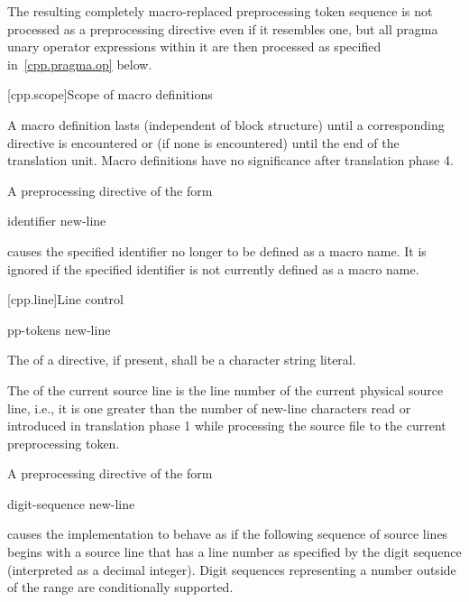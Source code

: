 \pnum
The resulting completely macro-replaced preprocessing token sequence
is not processed as a preprocessing directive even if it resembles one,
but all pragma unary operator expressions within it are then processed as
specified in~\ref{cpp.pragma.op} below.

[cpp.scope]{Scope of macro definitions}%
%

\pnum
A macro definition lasts
(independent of block structure)
until a corresponding
directive is encountered or
(if none is encountered)
until the end of the translation unit.
Macro definitions have no significance after translation phase 4.

\pnum
A preprocessing directive of the form
\begin{ncsimplebnf}
 identifier new-line
%
\end{ncsimplebnf}
causes the specified identifier no longer to be defined as a macro name.
It is ignored if the specified identifier is not currently defined as
a macro name.


[cpp.line]{Line control}%
%

\begin{bnf}
\br
     pp-tokens new-line
\end{bnf}

\pnum
The  of a
directive, if present,
shall be a character string literal.

\pnum
The
of the current source line is
the line number of the current physical source line,
i.e., it is one greater than
the number of new-line characters read or introduced
in translation phase 1
while processing the source file to the current preprocessing token.

\pnum
A preprocessing directive of the form
\begin{ncsimplebnf}
 digit-sequence new-line
\end{ncsimplebnf}
causes the implementation to behave as if
the following sequence of source lines begins with a
source line that has a line number as specified
by the digit sequence (interpreted as a decimal integer).
Digit sequences representing a number
outside of the range  are conditionally supported.

